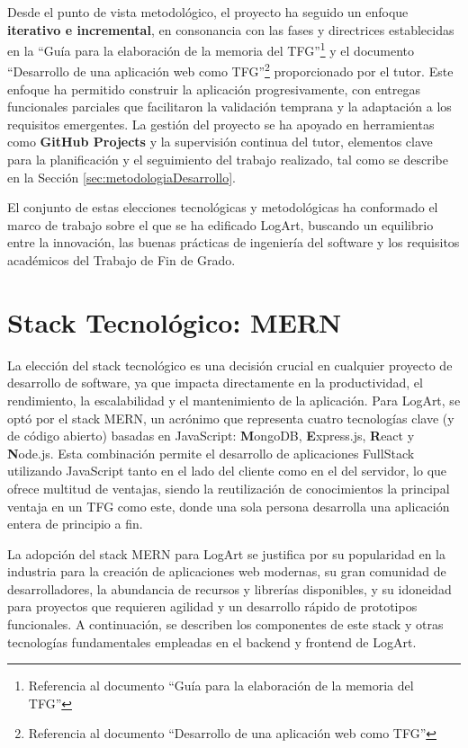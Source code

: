 Desde el punto de vista metodológico, el proyecto ha seguido un enfoque \textbf{iterativo e incremental}, en consonancia con las fases y directrices establecidas en la ``Guía para la elaboración de la memoria del TFG''\footnote{Referencia al documento ``Guía para la elaboración de la memoria del TFG''} y el documento ``Desarrollo de una aplicación web como TFG''\footnote{Referencia al documento ``Desarrollo de una aplicación web como TFG''} proporcionado por el tutor. Este enfoque ha permitido construir la aplicación progresivamente, con entregas funcionales parciales que facilitaron la validación temprana y la adaptación a los requisitos emergentes. La gestión del proyecto se ha apoyado en herramientas como \textbf{GitHub Projects} y la supervisión continua del tutor, elementos clave para la planificación y el seguimiento del trabajo realizado, tal como se describe en la Sección \ref{sec:metodologiaDesarrollo}.

El conjunto de estas elecciones tecnológicas y metodológicas ha conformado el marco de trabajo sobre el que se ha edificado LogArt, buscando un equilibrio entre la innovación, las buenas prácticas de ingeniería del software y los requisitos académicos del Trabajo de Fin de Grado.

\section{Stack Tecnológico: MERN}
\label{sec:stackMERN}

La elección del stack tecnológico es una decisión crucial en cualquier proyecto de desarrollo de software, ya que impacta directamente en la productividad, el rendimiento, la escalabilidad y el mantenimiento de la aplicación. Para LogArt, se optó por el stack MERN, un acrónimo que representa cuatro tecnologías clave (y de código abierto) basadas en JavaScript: \textbf{M}ongoDB, \textbf{E}xpress.js, \textbf{R}eact y \textbf{N}ode.js. Esta combinación permite el desarrollo de aplicaciones FullStack utilizando JavaScript tanto en el lado del cliente como en el del servidor, lo que ofrece multitud de ventajas\cite{adityabhuyanMERNAdvantages}, siendo la reutilización de conocimientos la principal ventaja en un TFG como este, donde una sola persona desarrolla una aplicación entera de principio a fin.

La adopción del stack MERN para LogArt se justifica por su popularidad en la industria para la creación de aplicaciones web modernas, su gran comunidad de desarrolladores, la abundancia de recursos y librerías disponibles, y su idoneidad para proyectos que requieren agilidad y un desarrollo rápido de prototipos funcionales. A continuación, se describen los componentes de este stack y otras tecnologías fundamentales empleadas en el backend y frontend de LogArt.

